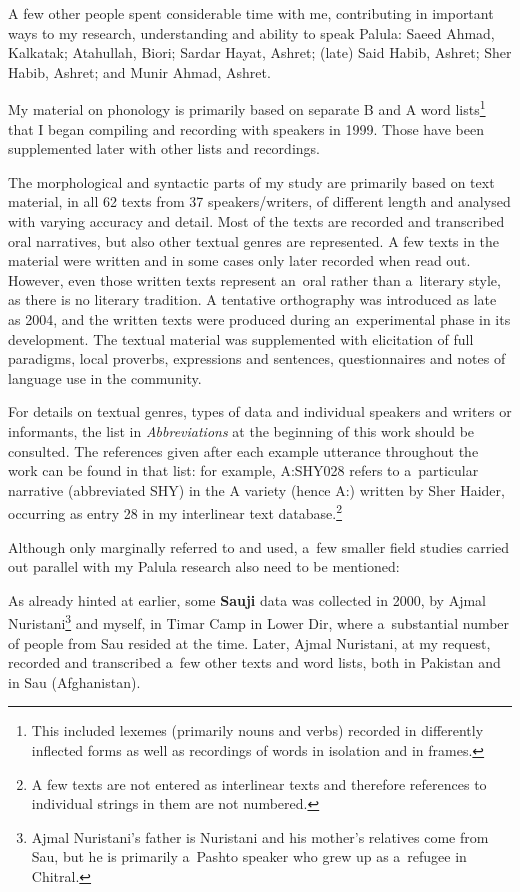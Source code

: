 A few other people spent considerable time with me, contributing in important ways to my research,
understanding and ability to speak Palula: Saeed Ahmad, Kalkatak; Atahullah, Biori; Sardar
Hayat, Ashret; (late) Said Habib, Ashret; Sher Habib, Ashret; and Munir Ahmad, Ashret.


My material on phonology is primarily based on separate B and A word lists\footnote{This included
  lexemes (primarily nouns and verbs) recorded in differently inflected forms as well as recordings
  of words in isolation and in frames.} that I began compiling and recording with speakers in
1999. Those have been supplemented later with other lists and recordings.


The morphological and syntactic parts of my study are primarily based on text material, in all 62
texts from 37 speakers/writers, of different length and analysed with varying accuracy and
detail. Most of the texts are recorded and transcribed oral narratives, but also other textual
genres are represented. A few texts in the material were written and in some cases only later
recorded when read out. However, even those written texts represent an~oral rather than a~literary
style, as there is no literary tradition. A tentative orthography was introduced as late as 2004,
and the written texts were produced during an~experimental phase in its development. The textual
material was supplemented with elicitation of full paradigms, local proverbs, expressions and sentences,
questionnaires and notes of language use in the community.

\largerpage[-1]
For details on textual genres, types of data and individual speakers and writers or informants, the
list in \textit{Abbreviations} at the beginning of this work should be consulted. The references given after
each example utterance throughout the work can be found in that list: for example, A:SHY028 refers to
a~particular narrative (abbreviated SHY) in the A variety (hence A:) written by Sher Haider, occurring as entry 28 in my interlinear text database.\footnote{A few texts are not entered as interlinear texts and therefore references to individual strings in them are not numbered.}


Although only marginally referred to and used, a~few smaller field studies carried out parallel with
my Palula research also need to be mentioned:


As already hinted at earlier, some \textbf{Sauji} data was collected in 2000, by Ajmal
Nuristani\footnote{Ajmal Nuristani's father is Nuristani and his mother's relatives come from Sau,
  but he is primarily a~Pashto speaker who grew up as a~refugee in Chitral.} and myself, in Timar
Camp in Lower Dir, where a~substantial number of people from Sau resided at the time. Later, Ajmal
Nuristani, at my request, recorded and transcribed a~few other texts and word lists, both in
Pakistan and in Sau (Afghanistan).


